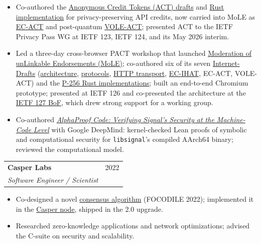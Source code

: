 \documentclass[10pt, letterpaper]{article}
\makeatletter
\newcommand{\entry}[4]{%
  \begin{tabularx}{\linewidth}{@{}X r@{}}
    \textbf{#1} & {\color{muted}\small #2} \\
    \textit{#3} & {\color{muted}\small #4} \\
  \end{tabularx}\par\vspace{-0.15em}}
\newcommand{\theme}[1]{\par\vspace{0.3em}{\color{muted}\small\itshape #1}\par\vspace{-0.05em}}
\makeatother
\begin{document}
\begin{itemize}
  \item Co-authored the \href{https://github.com/SamuelSchlesinger/draft-act}{Anonymous Credit Tokens (ACT) drafts} and \href{https://github.com/SamuelSchlesinger/anonymous-credit-tokens}{Rust implementation} for privacy-preserving API credits, now carried into MoLE as \href{https://moderation-of-unlinkable-endorsements.github.io/internet-drafts/draft-schlesinger-mole-ec-act.html}{EC-ACT} and post-quantum \href{https://moderation-of-unlinkable-endorsements.github.io/internet-drafts/draft-authors-mole-vole-act.html}{VOLE-ACT}; presented ACT to the IETF Privacy Pass WG at IETF 123, IETF 124, and its May 2026 interim.
  \item Led a three-day cross-browser PACT workshop that launched \href{https://github.com/Moderation-of-unLinkable-Endorsements}{Moderation of unLinkable Endorsements (MoLE)}; co-authored six of its seven \href{https://github.com/Moderation-of-unLinkable-Endorsements/internet-drafts}{Internet-Drafts} (\href{https://moderation-of-unlinkable-endorsements.github.io/internet-drafts/draft-jms-mole-architecture.html}{architecture}, \href{https://moderation-of-unlinkable-endorsements.github.io/internet-drafts/draft-jms-mole-protocols.html}{protocols}, \href{https://moderation-of-unlinkable-endorsements.github.io/internet-drafts/draft-jms-mole-http-transport.html}{HTTP transport}, \href{https://moderation-of-unlinkable-endorsements.github.io/internet-drafts/draft-ladd-mole-ec-ihat.html}{EC-IHAT}, EC-ACT, VOLE-ACT) and the \href{https://github.com/Moderation-of-unLinkable-Endorsements/mole-p256-rs}{P-256 Rust implementations}; built an end-to-end Chromium prototype; presented at IETF 126 and co-presented the architecture at the \href{https://youtu.be/LLEFuf5hscc}{IETF 127 BoF}, which drew strong support for a working group.
\end{itemize}
\theme{Formal verification}
\begin{itemize}
  \item Co-authored \href{https://github.com/google-deepmind/code-verification}{\textit{AlphaProof Code: Verifying Signal's Security at the Machine-Code Level}} with Google DeepMind: kernel-checked Lean proofs of symbolic and computational security for \texttt{libsignal}'s compiled AArch64 binary; reviewed the computational model.
\end{itemize}

\vspace{0.35em}
\entry{Casper Labs}{2022}{Software Engineer / Scientist}{}
\begin{itemize}
  \item Co-designed a novel \href{https://arxiv.org/abs/2205.06314}{consensus algorithm} (FOCODILE 2022); implemented it in the \href{https://github.com/casper-network/casper-node}{Casper node}, shipped in the 2.0 upgrade.
  \item Researched zero-knowledge applications and network optimizations; advised the C-suite on security and scalability.
\end{itemize}
\end{document}
